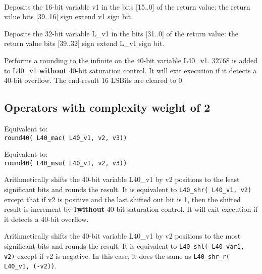 \ \\

Deposits the 16-bit variable v1 in the bits [15..0] of the return
value: the return value bits [39..16] sign extend v1 sign bit.


Deposits the 32-bit variable L\_v1 in the bits [31..0] of the
return value: the return value bits [39..32] sign extend L\_v1
sign bit.


Performs a rounding to the infinite on the 40-bit variable
L40\_v1. 32768 is added to L40\_v1 \textbf{without} 40-bit saturation
control. It will exit execution if it detects a 40-bit overflow.  The
end-result 16 LSBits are cleared to 0.


\subsection{Operators with complexity weight of 2}


Equivalent to: \\
{\tt round40( L40\_mac( L40\_v1, v2, v3)) }


Equivalent to: \\
{\tt round40( L40\_msu( L40\_v1, v2, v3)) }


Arithmetically shifts the 40-bit variable L40\_v1 by v2 positions to the least significant bits and rounds the result.
It is equivalent to {\tt L40\_shr( L40\_v1, v2)} except that if v2 is positive and the last shifted out bit is 1, then the shifted result is increment by 1\textbf{without} 40-bit saturation control.
It will exit execution if it detects a 40-bit overflow.


Arithmetically shifts the 40-bit variable L40\_v1 by v2 positions to the most significant bits and rounds the result.
It is equivalent to {\tt L40\_shl( L40\_var1, v2)} except if v2 is negative.
In this case, it does the same as {\tt L40\_shr\_r( L40\_v1, (-v2))}.

